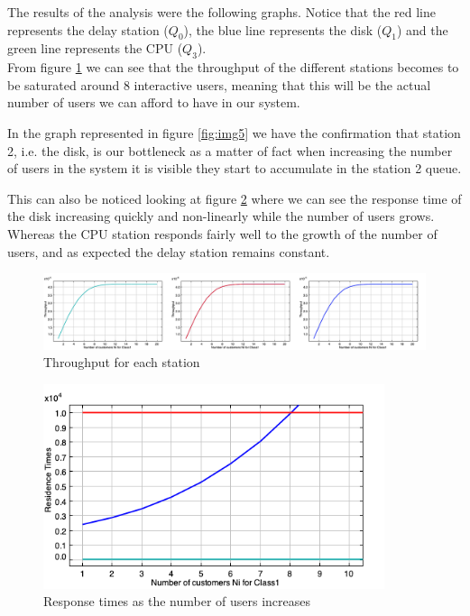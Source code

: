 \documentclass[11pt]{scrartcl} %
\begin{document}
The results of the analysis were the following graphs. Notice that the red line represents the delay station ($Q_0$), the blue line represents the disk ($Q_1$) and the green line represents the CPU ($Q_3$).\\

From figure \ref{fig:img3} we can see that the throughput of the different stations becomes to be saturated around 8 interactive users, meaning that this will be the actual number of users we can afford to have in our system.

In the graph represented in figure \ref{fig:img5} we have the confirmation that station 2, i.e. the disk, is our bottleneck as a matter of fact when increasing the number of users in the system it is visible they start to accumulate in the station 2 queue.

This can also be noticed looking at figure \ref{fig:img4} where we can see the response time  of the disk increasing quickly and non-linearly while the number of users grows. Whereas the CPU station responds fairly well to the growth of the number of users, and as expected the delay station remains constant.


\begin{figure}[h]
\centering
\includegraphics[width=12cm]{Images/JMVAthroughputside.png}
\caption{Throughput for each station}
\label{fig:img3}
\end{figure}

\begin{figure}[h]
\includegraphics[width=10cm]{Images/JMVAresTimes.png}
\centering
\caption{Response times as the  number  of users increases}
\label{fig:img4}
\end{figure}
\end{document}
